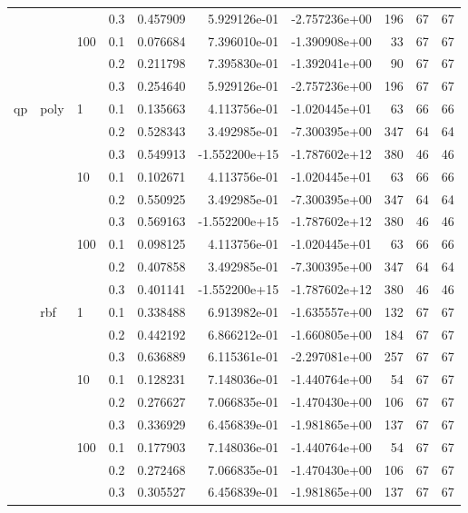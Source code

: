 \begin{table}[h!]
\begin{tabular}{llllrrrrrr}
   &     &     & 0.3 &  0.457909 &  5.929126e-01 & -2.757236e+00 &     196 &          67 &        67 \\
   &     & 100 & 0.1 &  0.076684 &  7.396010e-01 & -1.390908e+00 &      33 &          67 &        67 \\
   &     &     & 0.2 &  0.211798 &  7.395830e-01 & -1.392041e+00 &      90 &          67 &        67 \\
   &     &     & 0.3 &  0.254640 &  5.929126e-01 & -2.757236e+00 &     196 &          67 &        67 \\
qp & poly & 1   & 0.1 &  0.135663 &  4.113756e-01 & -1.020445e+01 &      63 &          66 &        66 \\
   &     &     & 0.2 &  0.528343 &  3.492985e-01 & -7.300395e+00 &     347 &          64 &        64 \\
   &     &     & 0.3 &  0.549913 & -1.552200e+15 & -1.787602e+12 &     380 &          46 &        46 \\
   &     & 10  & 0.1 &  0.102671 &  4.113756e-01 & -1.020445e+01 &      63 &          66 &        66 \\
   &     &     & 0.2 &  0.550925 &  3.492985e-01 & -7.300395e+00 &     347 &          64 &        64 \\
   &     &     & 0.3 &  0.569163 & -1.552200e+15 & -1.787602e+12 &     380 &          46 &        46 \\
   &     & 100 & 0.1 &  0.098125 &  4.113756e-01 & -1.020445e+01 &      63 &          66 &        66 \\
   &     &     & 0.2 &  0.407858 &  3.492985e-01 & -7.300395e+00 &     347 &          64 &        64 \\
   &     &     & 0.3 &  0.401141 & -1.552200e+15 & -1.787602e+12 &     380 &          46 &        46 \\
   & rbf & 1   & 0.1 &  0.338488 &  6.913982e-01 & -1.635557e+00 &     132 &          67 &        67 \\
   &     &     & 0.2 &  0.442192 &  6.866212e-01 & -1.660805e+00 &     184 &          67 &        67 \\
   &     &     & 0.3 &  0.636889 &  6.115361e-01 & -2.297081e+00 &     257 &          67 &        67 \\
   &     & 10  & 0.1 &  0.128231 &  7.148036e-01 & -1.440764e+00 &      54 &          67 &        67 \\
   &     &     & 0.2 &  0.276627 &  7.066835e-01 & -1.470430e+00 &     106 &          67 &        67 \\
   &     &     & 0.3 &  0.336929 &  6.456839e-01 & -1.981865e+00 &     137 &          67 &        67 \\
   &     & 100 & 0.1 &  0.177903 &  7.148036e-01 & -1.440764e+00 &      54 &          67 &        67 \\
   &     &     & 0.2 &  0.272468 &  7.066835e-01 & -1.470430e+00 &     106 &          67 &        67 \\
   &     &     & 0.3 &  0.305527 &  6.456839e-01 & -1.981865e+00 &     137 &          67 &        67 \\
\bottomrule
\end{tabular}
\end{table}
